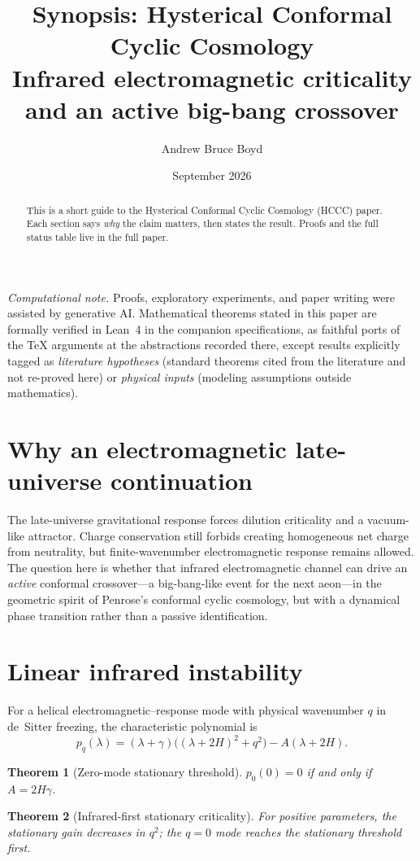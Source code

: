 \documentclass[11pt]{article}
\title{\textbf{Synopsis: Hysterical Conformal Cyclic Cosmology}\\[0.35em]
\large Infrared electromagnetic criticality and an active big-bang crossover}
\author{Andrew Bruce Boyd}
\date{September 2026}
\newtheorem{theorem}{Theorem}[section]
\theoremstyle{definition}
\theoremstyle{remark}
\begin{document}
\maketitle
\noindent\textit{Computational note.}
Proofs, exploratory experiments, and paper writing were assisted by generative AI.
Mathematical theorems stated in this paper are formally verified in Lean~4 in the
companion specifications, as faithful ports of the TeX arguments at the abstractions
recorded there, except results explicitly tagged as \emph{literature hypotheses}
(standard theorems cited from the literature and not re-proved here) or
\emph{physical inputs} (modeling assumptions outside mathematics).

\begin{abstract}
This is a short guide to the Hysterical Conformal Cyclic Cosmology (HCCC) paper.
Each section says \emph{why} the claim matters, then states the result.
Proofs and the full status table live in the full paper.
\end{abstract}

\section{Why an electromagnetic late-universe continuation}
The late-universe gravitational response forces dilution criticality and a vacuum-like
attractor.
Charge conservation still forbids creating homogeneous net charge from neutrality, but
finite-wavenumber electromagnetic response remains allowed.
The question here is whether that infrared electromagnetic channel can drive an
\emph{active} conformal crossover---a big-bang-like event for the next aeon---in the
geometric spirit of Penrose's conformal cyclic cosmology, but with a dynamical phase
transition rather than a passive identification.

\section{Linear infrared instability}
For a helical electromagnetic--response mode with physical wavenumber $q$ in de~Sitter
freezing, the characteristic polynomial is
\[
p_q(\lambda)=(\lambda+\gamma)\bigl((\lambda+2H)^2+q^2\bigr)-A(\lambda+2H).
\]

\begin{theorem}[Zero-mode stationary threshold]
$p_0(0)=0$ if and only if $A=2H\gamma$.
\end{theorem}

\begin{theorem}[Infrared-first stationary criticality]
For positive parameters, the stationary gain decreases in $q^2$; the $q=0$ mode reaches
the stationary threshold first.
\end{theorem}
\end{document}
